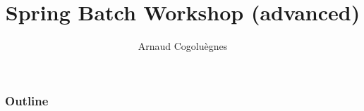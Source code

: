 \documentclass{beamer}
\title{Spring Batch Workshop (advanced)}
\author{Arnaud Cogoluègnes}
\institute{Consultant with Zenika, Co-author Spring Batch in Action}
\begin{document}
\begin{frame}
\titlepage
\end{frame}

\begin{frame}
 \frametitle{Outline}
 \scriptsize{\tableofcontents}
\end{frame}









\end{document}
